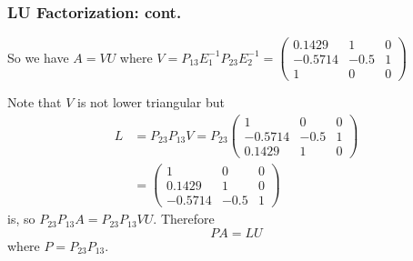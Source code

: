 \documentclass{beamer}
\begin{document}
\begin{frame}\frametitle{LU Factorization: cont.}
	So we have $A = VU$
	where 
	\(
	V = P_{13}E_1^{-1}P_{23}E_2^{-1} = 
	\begin{pmatrix}
    	0.1429 & 1 & 0\\
    	-0.5714 & -0.5 & 1\\
    	1 & 0 & 0
  	\end{pmatrix}
	\)
	
	\vfill
		
	Note that $V$ is not lower triangular but
	\begin{align*}
	L &= P_{23}P_{13}V = P_{23}
		\begin{pmatrix}
    		1 & 0 & 0\\
    		-0.5714 & -0.5 & 1\\
    		0.1429 & 1 & 0
  		\end{pmatrix} \\
		&= 
		\begin{pmatrix}
    		1 & 0 & 0\\
    		0.1429 & 1 & 0\\
    		-0.5714 & -0.5 & 1
  		\end{pmatrix}
	\end{align*}
	is, so
	\(
	P_{23}P_{13}A = P_{23}P_{13}VU.
	\)
	Therefore
	\[ 
	PA = LU 
	\]
	where $P = P_{23}P_{13}$.
\end{frame}
\end{document}
